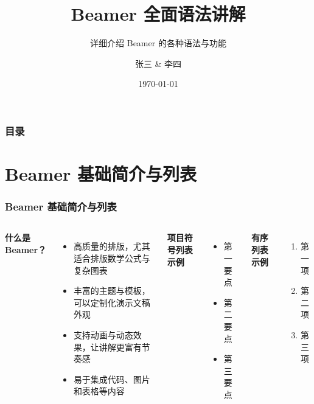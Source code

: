 \documentclass[aspectratio=169]{beamer}
\title{Beamer 全面语法讲解}         %
\subtitle{详细介绍 Beamer 的各种语法与功能} %
\author{张三 \& 李四}               %
\institute{某某大学 \\ 某某研究所}    %
\date{\today}                   %
\begin{document}
\begin{frame}
    \titlepage  
\end{frame}

\begin{frame}
    \frametitle{目录}
    \tableofcontents
\end{frame}

\section{Beamer 基础简介与列表}
\begin{frame}
    \frametitle{Beamer 基础简介与列表}
    \begin{columns}[T] %
        \textbf{什么是 Beamer？}
        \begin{itemize}
            \item 高质量的排版，尤其适合排版数学公式与复杂图表
            \item 丰富的主题与模板，可以定制化演示文稿外观
            \item 支持动画与动态效果，让讲解更富有节奏感
            \item 易于集成代码、图片和表格等内容
        \end{itemize}

        \textbf{项目符号列表示例}
        \begin{itemize}
            \item 第一要点
            \item 第二要点
            \item 第三要点
        \end{itemize}
        
        \textbf{有序列表示例}
        \begin{enumerate}
            \item 第一项
            \item 第二项
            \item 第三项
        \end{enumerate}
    \end{columns}
\end{frame}
\end{document}
